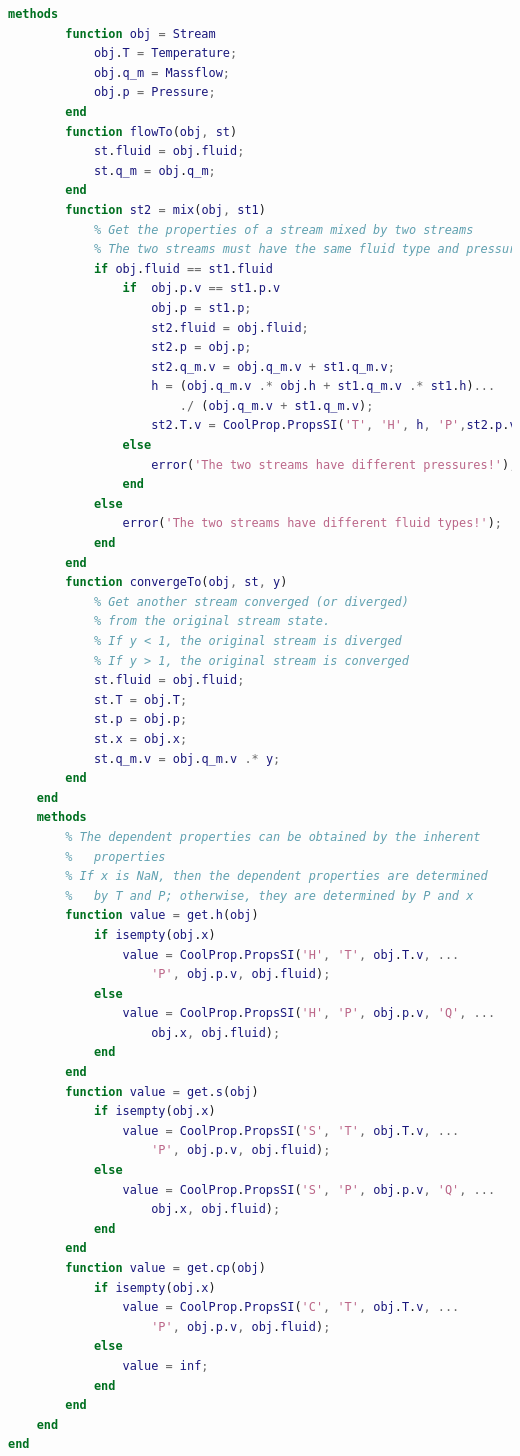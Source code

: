 \begin{lstlisting}[language= MATLAB, backgroundcolor = \color{yellow!20}, label = {lst:MATLAB_SOURCECODE}]
    methods
        function obj = Stream
            obj.T = Temperature;
            obj.q_m = Massflow;
            obj.p = Pressure;
        end
        function flowTo(obj, st)
            st.fluid = obj.fluid;
            st.q_m = obj.q_m;
        end
        function st2 = mix(obj, st1)
            % Get the properties of a stream mixed by two streams
            % The two streams must have the same fluid type and pressure
            if obj.fluid == st1.fluid
                if  obj.p.v == st1.p.v
                    obj.p = st1.p;
                    st2.fluid = obj.fluid;
                    st2.p = obj.p;
                    st2.q_m.v = obj.q_m.v + st1.q_m.v;
                    h = (obj.q_m.v .* obj.h + st1.q_m.v .* st1.h)...
                        ./ (obj.q_m.v + st1.q_m.v);
                    st2.T.v = CoolProp.PropsSI('T', 'H', h, 'P',st2.p.v);
                else
                    error('The two streams have different pressures!');
                end
            else
                error('The two streams have different fluid types!');
            end
        end
        function convergeTo(obj, st, y)
            % Get another stream converged (or diverged)
            % from the original stream state.
            % If y < 1, the original stream is diverged
            % If y > 1, the original stream is converged
            st.fluid = obj.fluid;
            st.T = obj.T;
            st.p = obj.p;
            st.x = obj.x;
            st.q_m.v = obj.q_m.v .* y;
        end
    end
    methods
        % The dependent properties can be obtained by the inherent
        %   properties
        % If x is NaN, then the dependent properties are determined
        %   by T and P; otherwise, they are determined by P and x
        function value = get.h(obj)
            if isempty(obj.x)
                value = CoolProp.PropsSI('H', 'T', obj.T.v, ...
                    'P', obj.p.v, obj.fluid);
            else
                value = CoolProp.PropsSI('H', 'P', obj.p.v, 'Q', ...
                    obj.x, obj.fluid);
            end
        end
        function value = get.s(obj)
            if isempty(obj.x)
                value = CoolProp.PropsSI('S', 'T', obj.T.v, ...
                    'P', obj.p.v, obj.fluid);
            else
                value = CoolProp.PropsSI('S', 'P', obj.p.v, 'Q', ...
                    obj.x, obj.fluid);
            end
        end
        function value = get.cp(obj)
            if isempty(obj.x)
                value = CoolProp.PropsSI('C', 'T', obj.T.v, ...
                    'P', obj.p.v, obj.fluid);
            else
                value = inf;
            end
        end
    end
end
\end{lstlisting}
